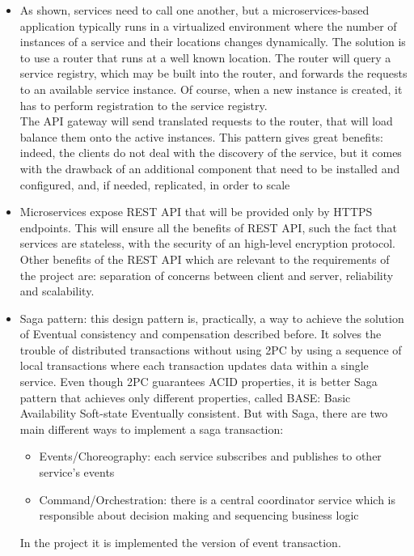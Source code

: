 \begin{itemize}
\item 
As shown, services need to call one another, but a microservices-based application typically runs in a virtualized 
environment where the number of instances of a service and their locations changes dynamically. 
The solution is to use a router that runs at a well known location. 
The router will query a service registry, which may be built into the
router, and forwards the requests to an available service instance.
Of course, when a new instance is created, it has to perform registration to the service registry. \\
The API gateway will send translated requests to the router, that will load balance them onto the active instances.
This pattern gives great benefits: indeed, the clients do not deal with the discovery of the service, but it comes with the drawback of
an additional component that need to be installed and configured, and, if needed, replicated, in order to scale
\item Microservices expose REST API that will be provided only by HTTPS endpoints. This will ensure
all the benefits of REST API, such the fact that services are stateless, with the security of an high-level encryption protocol. Other
benefits of the REST API which are relevant to the requirements of the project are: separation of concerns between client and server, reliability and scalability.
\item Saga pattern: this design pattern is, practically, a way to achieve the solution of Eventual consistency and compensation described before. It solves the trouble of distributed transactions without using 2PC by using a sequence of local transactions where each transaction updates data within a single service. Even though 2PC guarantees ACID properties, it is better Saga pattern that achieves only different properties, called BASE: Basic Availability Soft-state Eventually consistent.  But with Saga, there are two main different ways to implement a saga transaction:
\begin{itemize}
\item Events/Choreography: each service subscribes and publishes to other service's events
\item Command/Orchestration: there is a central coordinator service which is responsible about decision making and sequencing business logic 
\end{itemize}
In the project it is implemented the version of event transaction. 
\end{itemize}